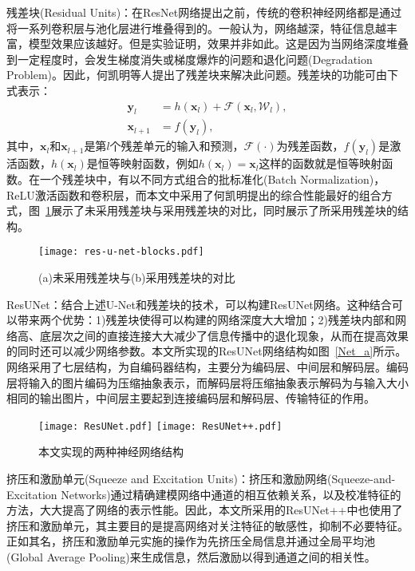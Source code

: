 残差块(Residual Units)：在ResNet网络提出之前，传统的卷积神经网络都是通过将一系列卷积层与池化层进行堆叠得到的。一般认为，网络越深，特征信息越丰富，模型效果应该越好。但是实验证明，效果并非如此。这是因为当网络深度堆叠到一定程度时，会发生梯度消失或梯度爆炸的问题和退化问题(Degradation Problem)\cite{he2016deep}。因此，何凯明等人提出了残差块来解决此问题。残差块的功能可由下式表示：
\begin{equation}
    \begin{split}
    \mathbf{y}_{l}\ \ \ & = h(\mathbf{x}_{l})+\mathcal{F}(\mathbf{x}_{l}, \mathcal{W}_{l}), \\
    \mathbf{x}_{l+1} & = f(\mathbf{y}_{l}),
    \end{split}
\end{equation}
其中，$\mathbf{x}_{l}$和$\mathbf{x}_{l+1}$是第$l$个残差单元的输入和预测，$\mathcal{F}(\cdot)$为残差函数，$f(\mathbf{y}_l)$是激活函数，$h(\mathbf{x}_{l})$是恒等映射函数，例如$h(\mathbf{x}_{l}) = \mathbf{x}_{l}$这样的函数就是恒等映射函数。在一个残差块中，有以不同方式组合的批标准化(Batch Normalization)，ReLU激活函数和卷积层，而本文中采用了何凯明\cite{he2016deep}提出的综合性能最好的组合方式，图~\ref{residual_compare}展示了未采用残差块与采用残差块的对比，同时展示了所采用残差块的结构。
\begin{figure}
    \centering
    \texttt{[image: res-u-net-blocks.pdf]}
    \caption{(a)未采用残差块与(b)采用残差块的对比}
    \label{residual_compare}
\end{figure}

ResUNet：结合上述U-Net和残差块的技术，可以构建ResUNet网络\cite{2017Road}。这种结合可以带来两个优势：1)残差块使得可以构建的网络深度大大增加；2)残差块内部和网络高、底层次之间的直接连接大大减少了信息传播中的退化现象，从而在提高效果的同时还可以减少网络参数。本文所实现的ResUNet网络结构如图~\ref{Net_a}所示。网络采用了七层结构，为自编码器结构，主要分为编码层、中间层和解码层。编码层将输入的图片编码为压缩抽象表示，而解码层将压缩抽象表示解码为与输入大小相同的输出图片，中间层主要起到连接编码层和解码层、传输特征的作用。
\begin{figure}
    \centering
      {\texttt{[image: ResUNet.pdf]}}
      {\texttt{[image: ResUNet++.pdf]}}
    \caption{本文实现的两种神经网络结构}
    \label{Net}
\end{figure}

挤压和激励单元(Squeeze and Excitation Units)：挤压和激励网络(Squeeze-and-Excitation Networks)\cite{2017Squeeze}通过精确建模网络中通道的相互依赖关系，以及校准特征的方法，大大提高了网络的表示性能。因此，本文所采用的ResUNet++中也使用了挤压和激励单元，其主要目的是提高网络对关注特征的敏感性，抑制不必要特征。正如其名，挤压和激励单元实施的操作为先挤压全局信息并通过全局平均池(Global Average Pooling)来生成信息，然后激励以得到通道之间的相关性。

